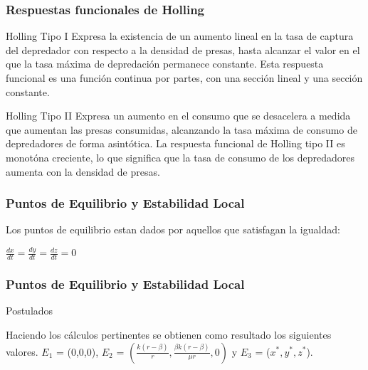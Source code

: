 \documentclass{beamer}
\begin{document}
\begin{frame}
	\frametitle{Respuestas funcionales de Holling}
	\begin{block}{Holling Tipo I}
		Expresa la existencia de un aumento lineal en la tasa de captura del depredador con respecto a la densidad de presas, hasta alcanzar el valor en
		el que la tasa máxima de depredación permanece constante. Esta respuesta funcional es una función continua por partes, con una sección lineal y una sección constante.
	\end{block}

	\begin{block}{Holling Tipo II}
		Expresa un aumento en el consumo que se desacelera a medida que aumentan las presas consumidas, alcanzando la tasa máxima de consumo de
		depredadores de forma asintótica. La respuesta funcional de Holling tipo II es monotóna creciente, lo que significa que la tasa de consumo
		de los depredadores aumenta con la densidad de presas.
	\end{block}
\end{frame}


\begin{frame}
	\frametitle{Puntos de Equilibrio y Estabilidad Local}
	\begin{minipage}{10cm}
		Los puntos de equilibrio estan dados por aquellos que satisfagan la igualdad:
		\begin{center}
			$\frac{dx}{dt} = \frac{dy}{dt} = \frac{dz}{dt} = 0$
		\end{center}
	\end{minipage}
\end{frame}

\begin{frame}
	\frametitle{Puntos de Equilibrio y Estabilidad Local}
	\begin{alertblock}{\begin{dinglist}{45}
				\item Postulados
			\end{dinglist}}
		\begin{minipage}{10cm}
			Haciendo los c\'alculos pertinentes se obtienen como resultado los siguientes valores.
			$E_1$ = (0,0,0), $E_2$ = $(\frac{k(r-\beta)}{r}, \frac{\beta k(r-\beta)}{\mu r}, 0)$ y $E_3$ = ($x^*,y^*,z^*$).
		\end{minipage}
	\end{alertblock}
\end{frame}
\end{document}
